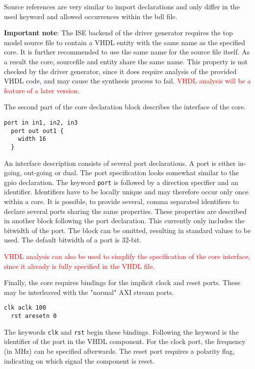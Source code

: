 \documentclass{report}
\begin{document}
Source references are very similar to import declarations and only differ in the used keyword and allowed occurrences within the bdl file.

\textbf{Important note}: The ISE backend of the driver generator requires the top model source file to contain a VHDL entity with the same name as the specified core. It is further recommended to use the same name for the source file itself. As a result the core, sourcefile and entity share the same name. This property is not checked by the driver generator, since it does require analysis of the provided VHDL code, and may cause the synthesis process to fail. \textcolor{red}{VHDL analysis will be a feature of a later version.}

The second part of the core declaration block describes the interface of the core.

\begin{lstlisting}[language=bdl]
  port in in1, in2, in3
  port out out1 {
    width 16
  }
\end{lstlisting}

An interface description consists of several port declarations. A port is either in-going, out-going or dual. The port specification looks somewhat similar to the gpio declaration. The keyword \texttt{port} is followed by a direction specifier and an identifier. Identifiers have to be locally unique and may therefore occur only once within a core. It is possible, to provide several, comma separated identifiers to declare several ports sharing the same properties. These properties are described in another block following the port declaration. This currently only includes the bitwidth of the port. The block can be omitted, resulting in standard values to be used. The default bitwidth of a port is 32-bit.

\textcolor{red}{VHDL analysis can also be used to simplify the specification of the core interface, since it already is fully specified in the VHDL file.}

Finally, the core requires bindings for the implicit clock and reset ports. These may be interleaved with the "normal" AXI stream ports.

\begin{lstlisting}[language=bdl]
  clk aclk 100
  rst aresetn 0
\end{lstlisting}

The keywords \texttt{clk} and \texttt{rst} begin these bindings. Following the keyword is the identifier of the port in the VHDL component. For the clock port, the frequency (in MHz) can be specified afterwards. The reset port requires a polarity flag, indicating on which signal the component is reset.
\end{document}
